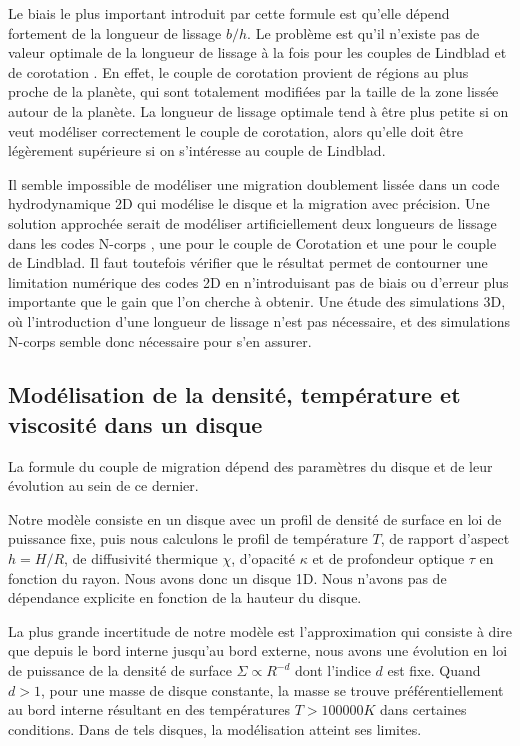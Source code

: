 Le biais le plus important introduit par cette formule est qu'elle dépend fortement de la longueur de lissage $b/h$. Le problème est qu'il n'existe pas de valeur optimale de la longueur de lissage à la fois pour les couples de Lindblad et de corotation \citep{masset2002coorbital}. En effet, le couple de corotation provient de régions au plus proche de la planète, qui sont totalement modifiées par la taille de la zone lissée autour de la planète. La longueur de lissage optimale tend à être plus petite si on veut modéliser correctement le couple de corotation, alors qu'elle doit être légèrement supérieure si on s'intéresse au couple de Lindblad. 

Il semble impossible de modéliser une migration doublement lissée dans un code hydrodynamique 2D qui modélise le disque et la migration avec précision. Une solution approchée serait de modéliser artificiellement deux longueurs de lissage dans les codes N-corps , une pour le couple de Corotation et une pour le couple de Lindblad. Il faut toutefois vérifier que le résultat permet de contourner une limitation numérique des codes 2D en n'introduisant pas de biais ou d'erreur plus importante que le gain que l'on cherche à obtenir. Une étude des simulations 3D, où l'introduction d'une longueur de lissage n'est pas nécessaire, et des simulations N-corps semble donc nécessaire pour s'en assurer. 

\subsection{Modélisation de la densité, température et viscosité dans un disque}
La formule du couple de migration dépend des paramètres du disque et de leur évolution au sein de ce dernier. 

Notre modèle consiste en un disque avec un profil de densité de surface en loi de puissance fixe, puis nous calculons le profil de température $T$, de rapport d'aspect $h=H/R$, de diffusivité thermique $\chi$, d'opacité $\kappa$ et de profondeur optique $\tau$ en fonction du rayon. Nous avons donc un disque 1D. Nous n'avons pas de dépendance explicite en fonction de la hauteur du disque. 

La plus grande incertitude de notre modèle est l'approximation qui consiste à dire que depuis le bord interne jusqu'au bord externe, nous avons une évolution en loi de puissance de la densité de surface $\Sigma\propto R^{-d}$ dont l'indice $d$ est fixe. Quand $d>1$, pour une masse de disque constante, la masse se trouve préférentiellement au bord interne résultant en des températures $T>100 000\unit{K}$ dans certaines conditions. Dans de tels disques, la modélisation atteint ses limites.

